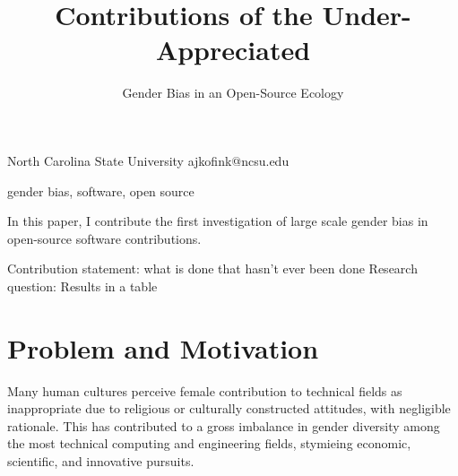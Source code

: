 \documentclass{sigplanconf}
\begin{document}
\setlength{\pdfpageheight}{\paperheight}
\setlength{\pdfpagewidth}{\paperwidth}






\title{Contributions of the Under-Appreciated}
\subtitle{Gender Bias in an Open-Source Ecology}

           {North Carolina State University}
           {ajkofink@ncsu.edu}

\maketitle

\begin{abstract}
\end{abstract}



\keywords
gender bias, software, open source

In this paper, I contribute the first investigation of large scale gender bias
in open-source software contributions.

Contribution statement: what is done that hasn't ever been done
Research question: 
Results in a table

\section{Problem and Motivation}
Many human cultures perceive female contribution to technical
fields as inappropriate due to religious or culturally constructed attitudes, with
negligible rationale. This has contributed to a gross imbalance in gender diversity among
the most technical computing and engineering fields, stymieing economic,
scientific, and innovative pursuits.
\end{document}
